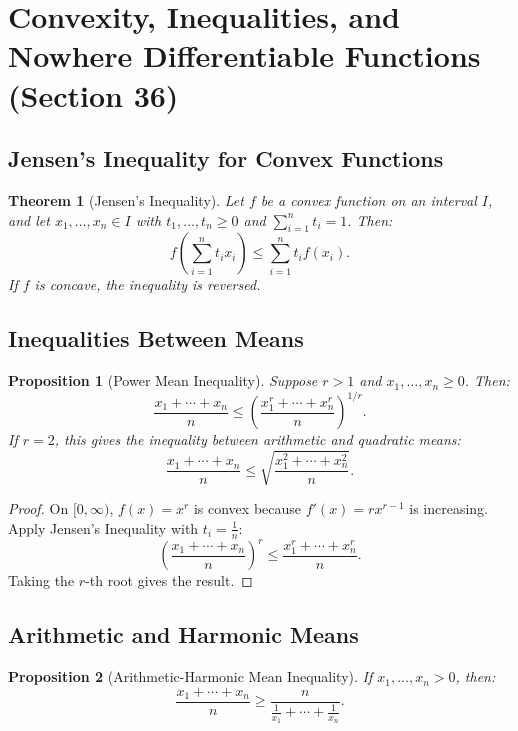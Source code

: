 \documentclass[9pt]{article}
\theoremstyle{definition}
\theoremstyle{plain}
\newtheorem{theorem}{Theorem}
\newtheorem{proposition}{Proposition}
\begin{document}
\section*{Convexity, Inequalities, and Nowhere Differentiable Functions (Section 36)}

\subsection*{Jensen’s Inequality for Convex Functions}
\begin{theorem}[Jensen’s Inequality]
Let \( f \) be a convex function on an interval \( I \), and let \( x_1, \ldots, x_n \in I \) with \( t_1, \ldots, t_n \geq 0 \) and \( \sum_{i=1}^n t_i = 1 \). Then:
\[
f\left(\sum_{i=1}^n t_i x_i\right) \leq \sum_{i=1}^n t_i f(x_i).
\]
If \( f \) is concave, the inequality is reversed.
\end{theorem}

\subsection*{Inequalities Between Means}
\begin{proposition}[Power Mean Inequality]
Suppose \( r > 1 \) and \( x_1, \ldots, x_n \geq 0 \). Then:
\[
\frac{x_1 + \cdots + x_n}{n} \leq \left(\frac{x_1^r + \cdots + x_n^r}{n}\right)^{1/r}.
\]
If \( r = 2 \), this gives the inequality between arithmetic and quadratic means:
\[
\frac{x_1 + \cdots + x_n}{n} \leq \sqrt{\frac{x_1^2 + \cdots + x_n^2}{n}}.
\]
\end{proposition}

\begin{proof}
On \( [0, \infty) \), \( f(x) = x^r \) is convex because \( f'(x) = rx^{r-1} \) is increasing. Apply Jensen’s Inequality with \( t_i = \frac{1}{n} \):
\[
\left(\frac{x_1 + \cdots + x_n}{n}\right)^r \leq \frac{x_1^r + \cdots + x_n^r}{n}.
\]
Taking the \( r \)-th root gives the result.
\end{proof}

\subsection*{Arithmetic and Harmonic Means}
\begin{proposition}[Arithmetic-Harmonic Mean Inequality]
If \( x_1, \ldots, x_n > 0 \), then:
\[
\frac{x_1 + \cdots + x_n}{n} \geq \frac{n}{\frac{1}{x_1} + \cdots + \frac{1}{x_n}}.
\]
\end{proposition}
\end{document}
